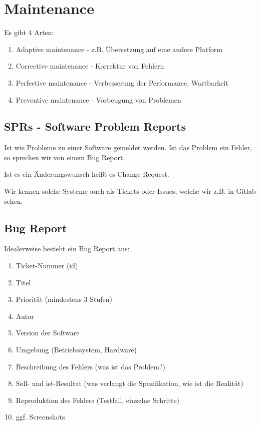 \documentclass[a4paper]{article}
\title{\docTitle}
\author{Moritz}
\date{\today}
\begin{document}
\maketitle
\tableofcontents


\section{Maintenance}

Es gibt 4 Arten:

\begin{enumerate}
    \item Adaptive maintenance - z.B. Übersetzung auf eine andere Platform
    \item Corrective maintenance - Korrektur von Fehlern
    \item Perfective maintenance - Verbesserung der Performance, Wartbarkeit
    \item Preventive maintenance - Vorbeugung von Problemen
\end{enumerate}

\subsection{SPRs - Software Problem Reports}

Ist wie Probleme zu einer Software gemeldet werden. Ist das Problem ein Fehler, so sprechen wir von einem Bug Report.

Ist es ein Änderungswunsch heißt es Change Request.

Wir kennen solche Systeme auch als Tickets oder Issues, welche wir z.B. in Gitlab sehen.

\subsection{Bug Report}

Idealerweise besteht ein Bug Report aus:

\begin{enumerate}
    \item Ticket-Nummer (id)
    \item Titel
    \item Priorität (mindestens 3 Stufen)
    \item Autor
    \item Version der Software
    \item Umgebung (Betriebssystem, Hardware)
    \item Beschreibung des Fehlers (was ist das Problem?)
    \item Soll- und ist-Resultat (was verlangt die Spezifikation, wie ist die Realität)
    \item Reproduktion des Fehlers (Testfall, einzelne Schritte)
    \item ggf. Screenshots
\end{enumerate}
\end{document}

